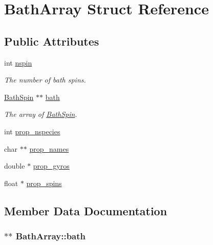 \hypertarget{structBathArray}{\section{Bath\-Array Struct Reference}
\label{structBathArray}
}
\subsection*{Public Attributes}
\begin{DoxyCompactItemize}
\item 
int \hyperlink{structBathArray_ac71d275f6b9a2293d80fe8edf69fc46f}{nspin}
\begin{DoxyCompactList}\small\item\em The number of bath spins. \end{DoxyCompactList}\item 
\hyperlink{structBathSpin}{Bath\-Spin} $\ast$$\ast$ \hyperlink{structBathArray_a807633d8e314f488e12dfc95040ecc01}{bath}
\begin{DoxyCompactList}\small\item\em The array of \hyperlink{structBathSpin}{Bath\-Spin}. \end{DoxyCompactList}\item 
int \hyperlink{structBathArray_a23c43fd398472286b1f80c5159896daf}{prop\-\_\-nspecies}
\item 
char $\ast$$\ast$ \hyperlink{structBathArray_a8349ee706336e916dd546a613fbb51e2}{prop\-\_\-names}
\item 
double $\ast$ \hyperlink{structBathArray_a79ff244bc7666f22c2bbb8072d3e3fa2}{prop\-\_\-gyros}
\item 
float $\ast$ \hyperlink{structBathArray_aca533199f1899634d7c1827864c89478}{prop\-\_\-spins}
\end{DoxyCompactItemize}


\subsection{Member Data Documentation}
\hypertarget{structBathArray_a807633d8e314f488e12dfc95040ecc01}{
\subsubsection[{bath}]{$\ast$$\ast$ Bath\-Array\-::bath}}\label{structBathArray_a807633d8e314f488e12dfc95040ecc01}


